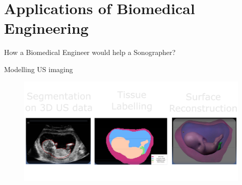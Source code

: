 
\section{Applications of Biomedical Engineering}









{
\begin{frame}{}

\BigSizeFont
How a Biomedical Engineer would help a Sonographer?
\end{frame}
}








{


\begin{frame}{Modelling US imaging}
      \begin{figure}
        \centering
        \includegraphics[width=1.0\textwidth]{./figures/modelling-us-imaging/versions/drawing-v02}
      \end{figure}
\end{frame}
}




%
%







